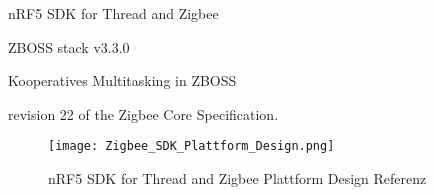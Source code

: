 nRF5 SDK for Thread and Zigbee

ZBOSS stack v3.3.0

Kooperatives Multitasking in ZBOSS

revision 22 of the Zigbee Core Specification.
 
 \begin{figure}[h]
	\centering
	\texttt{[image: Zigbee\_SDK\_Plattform\_Design.png]}
	\caption{nRF5 SDK for Thread and Zigbee Plattform Design Referenz \cite{nordic_semi_nrf_sdk_for_thread_and_zigbee_2020}}
	\label{fig:ZigbeePlattformDesign}
\end{figure}
 